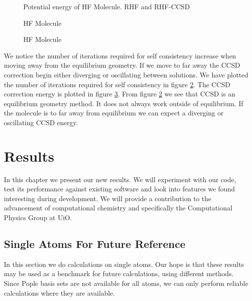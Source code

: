\begin{figure}[h!]
\begin{center}
\caption{Potential energy of HF Molecule. RHF and RHF-CCSD}
\label{fig:hfpoten}
\end{center}
\end{figure}

\newpage

\begin{figure}[h!]
\begin{center}
\caption{HF Molecule}
\label{fig:hfiter}
\end{center}
\end{figure}

\begin{figure}[h!]
\begin{center}
\caption{HF Molecule}
\label{fig:hfcorr}
\end{center}
\end{figure}

We notice the number of iterations required for self consistency increase when moving away from the equilibrium geometry. If we move to far away the CCSD correction begin either diverging or oscillating between solutions. We have plotted the number of iterations required for self consistency in figure \ref{fig:hfiter}. The CCSD correction energy is plotted in figure \ref{fig:hfcorr}. From figure \ref{fig:hfiter} we see that CCSD is an equilibrium geometry method. It does not always work outside of equilibrium. If the molecule is to far away from equilibrium we can expect a diverging or oscillating CCSD energy. 

\chapter{Results}
In this chapter we present our new results. We will experiment with our code, test its performance against existing software and look into features we found interesting during development. We will provide a contribution to the advancement of computational chemistry and specifically the Computational Physics Group at UiO. 

\section{Single Atoms For Future Reference}
In this section we do calculations on single atoms. Our hope is that these results may be used as a benchmark for future calculations, using different methods. Since Pople basis sets are not available for all atoms, we can only perform reliable calculations where they are available. \\

